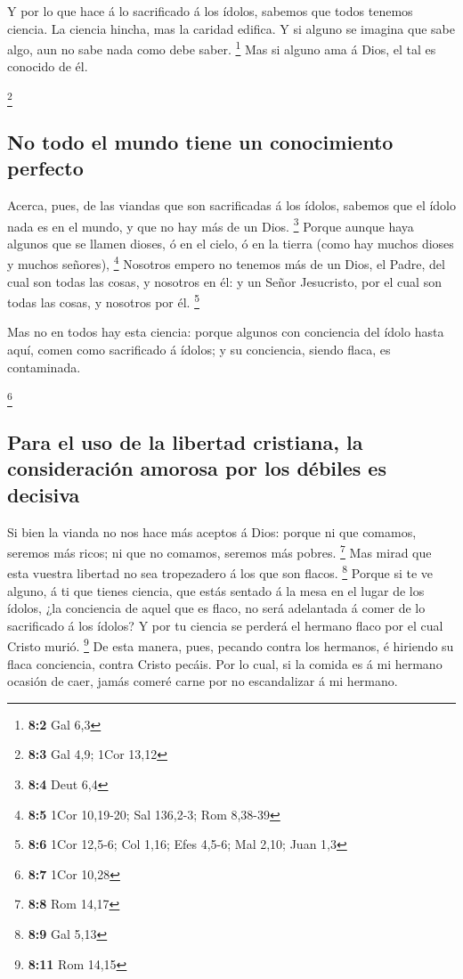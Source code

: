  Y por lo que hace á lo sacrificado á los ídolos, sabemos
que todos tenemos ciencia. La ciencia hincha, mas la caridad edifica.
 Y si alguno se imagina que sabe algo, aun no sabe nada
como debe saber. \footnote{\textbf{8:2} Gal 6,3}  Mas si
alguno ama á Dios, el tal es conocido de él.

\footnote{\textbf{8:3} Gal 4,9; 1Cor 13,12}

\hypertarget{no-todo-el-mundo-tiene-un-conocimiento-perfecto}{%
\subsection{No todo el mundo tiene un conocimiento
perfecto}\label{no-todo-el-mundo-tiene-un-conocimiento-perfecto}}

 Acerca, pues, de las viandas que son sacrificadas á los
ídolos, sabemos que el ídolo nada es en el mundo, y que no hay más de un
Dios. \footnote{\textbf{8:4} Deut 6,4}  Porque aunque haya
algunos que se llamen dioses, ó en el cielo, ó en la tierra (como hay
muchos dioses y muchos señores), \footnote{\textbf{8:5} 1Cor 10,19-20;
  Sal 136,2-3; Rom 8,38-39}  Nosotros empero no tenemos
más de un Dios, el Padre, del cual son todas las cosas, y nosotros en
él: y un Señor Jesucristo, por el cual son todas las cosas, y nosotros
por él. \footnote{\textbf{8:6} 1Cor 12,5-6; Col 1,16; Efes 4,5-6; Mal
  2,10; Juan 1,3}

 Mas no en todos hay esta ciencia: porque algunos con
conciencia del ídolo hasta aquí, comen como sacrificado á ídolos; y su
conciencia, siendo flaca, es contaminada.

\footnote{\textbf{8:7} 1Cor 10,28}

\hypertarget{para-el-uso-de-la-libertad-cristiana-la-consideraciuxf3n-amorosa-por-los-duxe9biles-es-decisiva}{%
\subsection{Para el uso de la libertad cristiana, la consideración
amorosa por los débiles es
decisiva}\label{para-el-uso-de-la-libertad-cristiana-la-consideraciuxf3n-amorosa-por-los-duxe9biles-es-decisiva}}

 Si bien la vianda no nos hace más aceptos á Dios: porque
ni que comamos, seremos más ricos; ni que no comamos, seremos más
pobres. \footnote{\textbf{8:8} Rom 14,17}  Mas mirad que
esta vuestra libertad no sea tropezadero á los que son flacos.
\footnote{\textbf{8:9} Gal 5,13}  Porque si te ve alguno,
á ti que tienes ciencia, que estás sentado á la mesa en el lugar de los
ídolos, ¿la conciencia de aquel que es flaco, no será adelantada á comer
de lo sacrificado á los ídolos?  Y por tu ciencia se
perderá el hermano flaco por el cual Cristo murió. \footnote{\textbf{8:11}
  Rom 14,15}  De esta manera, pues, pecando contra los
hermanos, é hiriendo su flaca conciencia, contra Cristo pecáis.
 Por lo cual, si la comida es á mi hermano ocasión de
caer, jamás comeré carne por no escandalizar á mi hermano.

